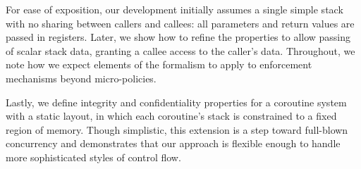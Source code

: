 \documentclass[acmsmall,review,anonymous]{acmart}\settopmatter{printfolios=true,printccs=false,printacmref=false}
\begin{document}




For ease of exposition, our development initially assumes a single simple
stack with no sharing between callers and callees: all parameters and return
values are passed in registers.  Later, we show how to refine the properties
to allow passing of scalar stack data, granting a callee access to the
caller's data. Throughout, we note how we expect elements of the formalism
to apply to enforcement mechanisms beyond micro-policies.

Lastly, we define integrity and confidentiality properties for a coroutine
system with a static layout, in which each coroutine's stack is constrained
to a fixed region of memory.  Though simplistic, this extension is a step
toward full-blown concurrency and demonstrates that our approach is flexible
enough to handle more sophisticated styles of control flow.
\end{document}
